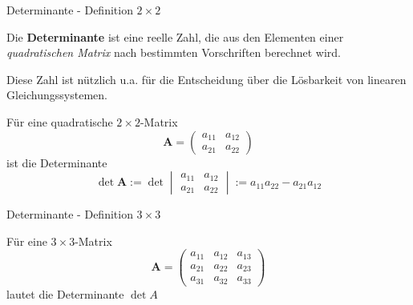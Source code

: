 \begin{frame}{Determinante - Definition $2 \times 2$}
	\begin{definition}
		Die \textbf{Determinante} ist eine reelle Zahl, die aus den Elementen einer \emph{quadratischen Matrix} nach bestimmten Vorschriften berechnet wird.
		
		Diese Zahl ist nützlich u.a. für die Entscheidung über die Lösbarkeit von linearen Gleichungssystemen.
	\end{definition}
	\begin{definition}
		Für eine quadratische $2 \times 2$-Matrix
		\[
			\pmb{A} = 	\begin{pmatrix}
			a_{11} & a_{12} \\
			a_{21} & a_{22}
			\end{pmatrix}
		\]
		ist die Determinante
		\[
		\det \pmb{A} := \det \begin{vmatrix}
		a_{11} & a_{12} \\
		a_{21} & a_{22}
		\end{vmatrix} := a_{11} a_{22} - a_{21} a_{12}
		\]
	\end{definition}
\end{frame}

\begin{frame}{Determinante - Definition $3 \times 3$}
	\begin{definition}
		Für eine $3 \times 3$-Matrix \[
		\pmb{A} = \begin{pmatrix}
		a_{11} & a_{12} & a_{13} \\
		a_{21} & a_{22} & a_{23} \\
		a_{31} & a_{32} & a_{33}
		\end{pmatrix}
		\]
		lautet die Determinante $\det A$
	\end{definition}
\end{frame}

